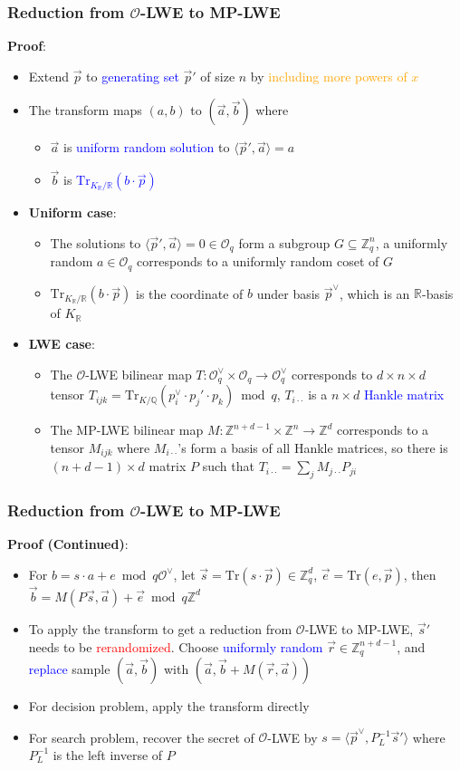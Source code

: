 \documentclass{beamer}
\newcommand{\blue}[1]{\textcolor{blue}{#1}}
\newcommand{\orange}[1]{\textcolor{orange}{#1}}
\newcommand{\red}[1]{\textcolor{red}{#1}}
\newcommand{\cO}{\mathcal{O}}
\newcommand{\bbR}{\mathbb{R}}
\newcommand{\bbZ}{\mathbb{Z}}
\newcommand{\Tr}{\mathrm{Tr}}
\newcommand{\TrKQ}{\mathrm{Tr}_{K/\mathbb{Q}}}
\newcommand{\TrKRR}{\mathrm{Tr}_{K_{\mathbb{R}}/\mathbb{R}}}
\newcommand{\cOV}{\mathcal{O}^{\vee}}
\newcommand{\KR}{K_{\mathbb{R}}}
\newcommand{\va}{\vec{a}}
\newcommand{\vb}{\vec{b}}
\newcommand{\ve}{\vec{e}}
\newcommand{\vp}{\vec{p}}
\newcommand{\vr}{\vec{r}}
\newcommand{\vs}{\vec{s}}
\newcommand{\vpV}{\vec{p}^{\vee}}
\begin{document}
\frame
{
  \frametitle{Reduction from $\cO$-LWE to MP-LWE}
  \textbf{Proof}:
  \begin{itemize}
  	\item Extend $\vp$ to \blue{generating set} $\vp'$ of size $n$ by \orange{including more powers of $x$}
  	\item The transform maps $(a,b)$ to $(\va,\vb)$ where
	  	\begin{itemize}
	  		\item $\va$ is \blue{uniform random solution} to $\langle\vp',\va\rangle=a$
	  		\item $\vb$ is \blue{$\TrKRR(b\cdot\vp)$}
	  	\end{itemize}
	  \item \textbf{Uniform case}:
	  	\begin{itemize}
	  		\item The solutions to $\langle\vp',\va\rangle=0\in\cO_q$ form a subgroup $G\subseteq\bbZ_q^n$, a uniformly random $a\in\cO_q$ corresponds to a uniformly random coset of $G$
	  		\item $\TrKRR(b\cdot\vp)$ is the coordinate of $b$ under basis $\vpV$, which is an $\bbR$-basis of $\KR$
	  	\end{itemize}
	  \item \textbf{LWE case}:
	  	\begin{itemize}
	  		\item The $\cO$-LWE bilinear map $T:\cOV_q\times\cO_q\to\cOV_q$ corresponds to $d\times n\times d$ tensor $T_{ijk}=\TrKQ(p_i^{\vee}\cdot p_j'\cdot p_k)\bmod q$, $T_{i\cdot\cdot}$ is a $n\times d$ \blue{Hankle matrix}
	  		\item The MP-LWE bilinear map $M:\bbZ^{n+d-1}\times\bbZ^n\to\bbZ^d$ corresponds to a tensor $M_{ijk}$ where $M_{i\cdot\cdot}$'s form a basis of all Hankle matrices, so there is $(n+d-1)\times d$ matrix $P$ such that $T_{i\cdot\cdot}=\sum_{j}M_{j\cdot\cdot}P_{ji}$
	  	\end{itemize}
  \end{itemize}
}

\frame
{
  \frametitle{Reduction from $\cO$-LWE to MP-LWE}
  \textbf{Proof (Continued)}:
  \begin{itemize}
  	\item For $b=s\cdot a+e\bmod q\cOV$, let $\vs=\Tr(s\cdot\vp)\in\bbZ_q^d$, $\ve=\Tr(e,\vp)$, then $\vb=M(P\vs,\va)+\ve\bmod q\bbZ^d$
  	\item To apply the transform to get a reduction from $\cO$-LWE to MP-LWE, $\vs'$ needs to be \red{rerandomized}. Choose \blue{uniformly random} $\vr\in\bbZ_q^{n+d-1}$, and \blue{replace} sample $(\va,\vb)$ with $(\va,\vb+M(\vr,\va))$
  	\item For decision problem, apply the transform directly
  	\item For search problem, recover the secret of $\cO$-LWE by $s=\langle\vpV,P_L^{-1}\vs'\rangle$ where $P_L^{-1}$ is the left inverse of $P$
  \end{itemize}
}
\end{document}
